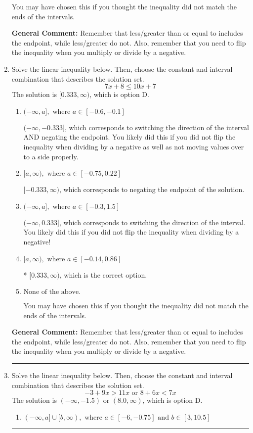 \documentclass{extbook}[14pt]
\newcommand{\litem}[1]{\item #1

\rule{\textwidth}{0.4pt}}
\begin{document}
\begin{enumerate}
{\begin{enumerate}[label=\Alph*.]
You may have chosen this if you thought the inequality did not match the ends of the intervals.
\end{enumerate}

\textbf{General Comment:} Remember that less/greater than or equal to includes the endpoint, while less/greater do not. Also, remember that you need to flip the inequality when you multiply or divide by a negative.
}
\litem{
Solve the linear inequality below. Then, choose the constant and interval combination that describes the solution set.
\[ 7x + 8 \leq 10x + 7 \]The solution is \( [0.333, \infty) \), which is option D.\begin{enumerate}[label=\Alph*.]
\item \( (-\infty, a], \text{ where } a \in [-0.6, -0.1] \)

 $(-\infty, -0.333]$, which corresponds to switching the direction of the interval AND negating the endpoint. You likely did this if you did not flip the inequality when dividing by a negative as well as not moving values over to a side properly.
\item \( [a, \infty), \text{ where } a \in [-0.75, 0.22] \)

 $[-0.333, \infty)$, which corresponds to negating the endpoint of the solution.
\item \( (-\infty, a], \text{ where } a \in [-0.3, 1.5] \)

 $(-\infty, 0.333]$, which corresponds to switching the direction of the interval. You likely did this if you did not flip the inequality when dividing by a negative!
\item \( [a, \infty), \text{ where } a \in [-0.14, 0.86] \)

* $[0.333, \infty)$, which is the correct option.
\item \( \text{None of the above}. \)

You may have chosen this if you thought the inequality did not match the ends of the intervals.
\end{enumerate}

\textbf{General Comment:} Remember that less/greater than or equal to includes the endpoint, while less/greater do not. Also, remember that you need to flip the inequality when you multiply or divide by a negative.
}
\litem{
Solve the linear inequality below. Then, choose the constant and interval combination that describes the solution set.
\[ -3 + 9 x > 11 x \text{ or } 8 + 6 x < 7 x \]The solution is \( (-\infty, -1.5) \text{ or } (8.0, \infty) \), which is option D.\begin{enumerate}[label=\Alph*.]
\item \( (-\infty, a] \cup [b, \infty), \text{ where } a \in [-6, -0.75] \text{ and } b \in [3, 10.5] \)


\end{enumerate}}
\end{enumerate}
\end{document}
